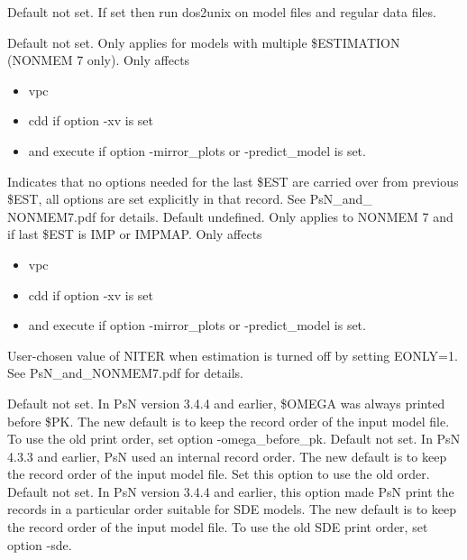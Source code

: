 \begin{optionlist}
Default not set. If set then run dos2unix on model files and regular data files.
\nextopt
{}

Default not set. Only applies for models with multiple \$ESTIMATION (NONMEM 7 only). Only affects 
\begin{itemize}
\item vpc
\item cdd if option -xv is set
\item and execute if option -mirror\_plots or -predict\_model is set.
\end{itemize} 
Indicates that no options needed for the last \$EST are carried over from previous \$EST, all options are set explicitly in that record. See PsN\_and\_ NONMEM7.pdf for details. 
\nextopt
{}
Default undefined. Only applies to NONMEM 7 and if last \$EST is IMP or IMPMAP.  Only affects
\begin{itemize}
	\item vpc
	\item cdd if option -xv is set
	\item and execute if option -mirror\_plots or -predict\_model is set.
\end{itemize}
User-chosen value of NITER when estimation is turned off by setting EONLY=1. See PsN\_and\_NONMEM7.pdf for details. 

\nextopt
{}
Default not set. In PsN version 3.4.4 and earlier, \$OMEGA was always printed before \$PK. The new default is to keep the record order of the input model file. To use the old print order, set option -omega\_before\_pk.
\nextopt
{}
Default not set. In PsN 4.3.3 and earlier, PsN used an internal record order. The new default is to keep the record order of the input model file. Set this option to use the old order.
\nextopt
{}
Default not set. In PsN version 3.4.4 and earlier, this option made PsN print the records in a particular order suitable for SDE models. The new default is to keep the record order of the input model file. To use the old SDE print order, set option -sde.
\nextopt
\end{optionlist}
